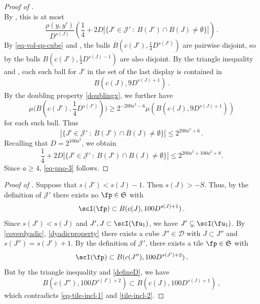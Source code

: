\begin{proof}[Proof of ]
$$        $$
        By , this is at most
        $$
             \frac{\rho(y,y')}{D^{s(J)}} \left( \frac{1}{4} + 2D |\{J' \in \mathcal{J}' \ : \ B(J') \cap B(J) \ne \emptyset\}|\right)\,.
        $$
        By \eqref{eq-vol-sp-cube} and , the balls $B(c(J'), \frac{1}{4} D^{s(J')})$ are pairwise disjoint, so by  the balls $B(c(J'), \frac{1}{4} D^{s(J) - 1})$ are also disjoint. By the triangle inequality and , each such ball for $J'$ in the set of the last display is contained in
        $$
            B(c(J), 9 D^{s(J) + 1})\,.
        $$
        By the doubling property \eqref{doublingx}, we further have
        $$
            \mu\Big(B(c(J'), \frac{1}{4}D^{s(J')})\Big) \ge 2^{-200a^3 - 6} \mu(B(c(J), 9 D^{s(J) + 1}))
        $$
        for each such ball.
        Thus
        $$
            |\{J' \in \mathcal{J}' \ : \ B(J') \cap B(J) \ne \emptyset\}| \le 2^{200a^3 + 6}\,.
        $$
        Recalling that $D=2^{100a^2}$, we obtain
        $$\frac{1}{4} + 2D |\{J' \in \mathcal{J}' \ : \ B(J') \cap B(J) \ne \emptyset\}|\leq 2^{200a^3 + 100a^2+ 8}.$$
        Since $a\ge 4$, \eqref{eq-pao-3} follows.
    \end{proof}

    \begin{proof}[Proof of ]
        Suppose that $s(J') < s(J) - 1$. Then $s(J) > -S$. Thus, by the definition of $\mathcal{J}'$ there exists no $\fp \in \mathfrak{S}$ with
      \begin{equation}
            \label{eq-tile-incl-1}
            \scI(\fp) \subset B(c(J), 100D^{s(J) + 1})\,.
        \end{equation}
        Since $s(J') < s(J)$ and $J', J \subset \scI(\fu_1)$, we have $J' \subsetneq \scI(\fu_1)$.
        By \eqref{coverdyadic}, \eqref{dyadicproperty} there exists a cube $J'' \in \mathcal{D}$ with $J \subset J''$ and $s(J'') = s(J') + 1$. By the definition of $\mathcal{J}'$, there exists a tile $\fp \in \mathfrak{S}$ with
      \begin{equation}
            \label{tile-incl-2}
            \scI(\fp) \subset B(c(J''), 100 D^{s(J')+2})\,.
        \end{equation}
        But by the triangle inequality and \eqref{defineD}, we have
        $$
            B(c(J''), 100 D^{s(J')+2}) \subset B(c(J), 100D^{s(J) + 1})\,,
        $$
        which contradicts \eqref{eq-tile-incl-1} and \eqref{tile-incl-2}.
    \end{proof}


